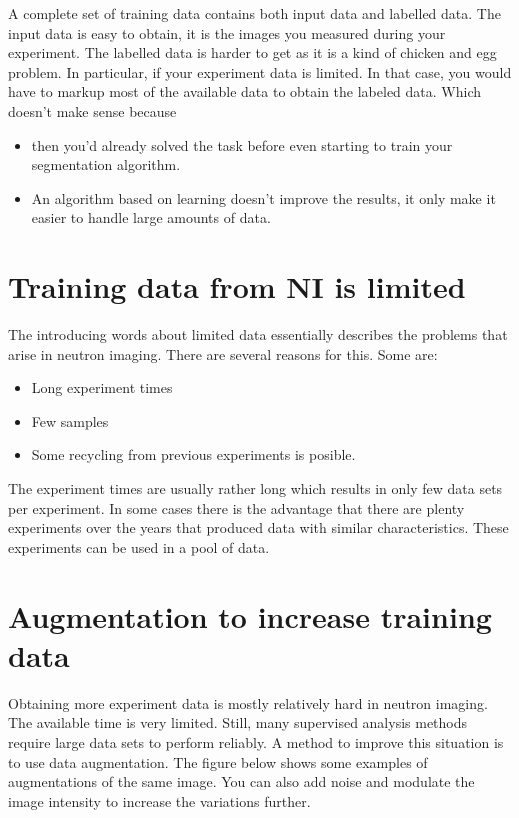 \documentclass[letterpaper,10pt,english]{sphinxmanual}
\begin{document}
A complete set of training data contains both input data and labelled data. The input data is easy to obtain, it is the images you measured during your experiment. The labelled data is harder to get as it is a kind of chicken and egg problem. In particular, if your experiment data is limited. In that case, you would have to mark\sphinxhyphen{}up most of the available data to obtain the labeled data. Which doesn’t make sense because
\begin{itemize}
\item {} 
then you’d already solved the task before even starting to train your segmentation algorithm.

\item {} 
An algorithm based on learning doesn’t improve the results, it only make it easier to handle large amounts of data.

\end{itemize}


\section{Training data from NI is limited}
\label{\detokenize{ML4NeutronImageSegmentation:training-data-from-ni-is-limited}}
The introducing words about limited data essentially describes the problems that arise in neutron imaging. There are several reasons for this. Some are:
\begin{itemize}
\item {} 
Long experiment times

\item {} 
Few samples

\item {} 
Some recycling from previous experiments is posible.

\end{itemize}

The experiment times are usually rather long which results in only few data sets per experiment. In some cases there is the advantage that there are plenty experiments over the years that produced data with similar characteristics. These experiments can be used in a pool of data.


\section{Augmentation to increase training data}
\label{\detokenize{ML4NeutronImageSegmentation:augmentation-to-increase-training-data}}
Obtaining more experiment data is mostly relatively hard in neutron imaging. The available time is very limited. Still, many supervised analysis methods require large data sets to perform reliably. A method to improve this situation is to use data augmentation. The figure below shows some examples of augmentations of the same image. You can also add noise and modulate the image intensity to increase the variations further.
\end{document}
